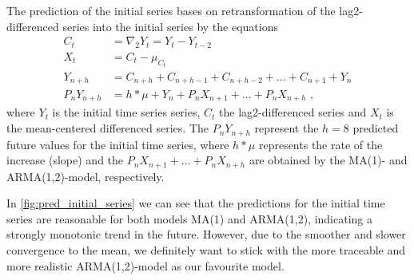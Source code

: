 \documentclass[11pt,a4paper]{article}
\begin{document}
The prediction of the initial series bases on retransformation of the lag2-differenced series into the initial series by the equations
\begin{align*}
    C_t &= \nabla_2 Y_t = Y_t - Y_{t-2}\\
    X_t &= C_t - \mu_{C_t} \\
    Y_{n+h} &= C_{n+h} + C_{n+h-1} + C_{n+h-2} + \ldots + C_{n+1} + Y_n  \\
    P_n Y_{n+h} &= h*\mu + Y_n+ P_n X_{n+1} + \ldots + P_n X_{n+h}
    \text{\ ,}
\end{align*}
where $Y_t$ is the initial time series series, $C_t$ the lag2-differenced series and $X_t$ is the mean-centered differenced series.
The $P_n Y_{n+h}$ represent the $h=8$ predicted future values for the initial time series, where $h*\mu$ represents the rate of the increase (slope) and the $P_n X_{n+1} + \ldots + P_n X_{n+h} $ are obtained by the MA(1)- and ARMA(1,2)-model, respectively.

In \cref{fig:pred_initial_series} we can see that the predictions for the initial time series are reasonable for both models MA(1) and ARMA(1,2), indicating a strongly monotonic trend in the future.
However, due to the smoother and slower convergence to the mean, we definitely want to stick with the more traceable and more realistic ARMA(1,2)-model as our favourite model.




\end{document}
